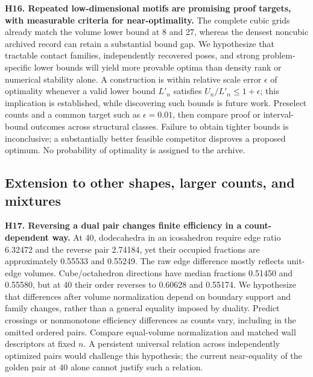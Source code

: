 \documentclass[11pt,a4paper]{article}
\begin{document}
\textbf{H16. Repeated low-dimensional motifs are promising proof targets, with measurable criteria for near-optimality.} The complete cubic grids already match the volume lower bound at 8 and 27, whereas the densest noncubic archived record can retain a substantial bound gap. We hypothesize that tractable contact families, independently recovered poses, and strong problem-specific lower bounds will yield more provable optima than density rank or numerical stability alone. A construction is within relative scale error $\epsilon$ of optimality whenever a valid lower bound $L'_n$ satisfies $U_n/L'_n\le1+\epsilon$; this implication is established, while discovering such bounds is future work. Preselect counts and a common target such as $\epsilon=0.01$, then compare proof or interval-bound outcomes across structural classes. Failure to obtain tighter bounds is inconclusive; a substantially better feasible competitor disproves a proposed optimum. No probability of optimality is assigned to the archive.

\subsection{Extension to other shapes, larger counts, and mixtures}

\textbf{H17. Reversing a dual pair changes finite efficiency in a count-dependent way.} At 40, dodecahedra in an icosahedron require edge ratio 6.32472 and the reverse pair 2.74184, yet their occupied fractions are approximately 0.55533 and 0.55249. The raw edge difference mostly reflects unit-edge volumes. Cube/octahedron directions have median fractions 0.51450 and 0.55580, but at 40 their order reverses to 0.60628 and 0.55174. We hypothesize that differences after volume normalization depend on boundary support and family changes, rather than a general equality imposed by duality. Predict crossings or nonmonotone efficiency differences as counts vary, including in the omitted ordered pairs. Compare equal-volume normalization and matched wall descriptors at fixed $n$. A persistent universal relation across independently optimized pairs would challenge this hypothesis; the current near-equality of the golden pair at 40 alone cannot justify such a relation.
\end{document}
